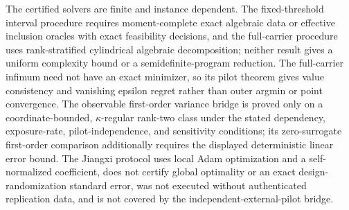 The certified solvers are finite and instance dependent.  The fixed-threshold interval procedure requires moment-complete exact algebraic data or effective inclusion oracles with exact feasibility decisions, and the full-carrier procedure uses rank-stratified cylindrical algebraic decomposition; neither result gives a uniform complexity bound or a semidefinite-program reduction.  The full-carrier infimum need not have an exact minimizer, so its pilot theorem gives value consistency and vanishing epsilon regret rather than outer argmin or point convergence.  The observable first-order variance bridge is proved only on a coordinate-bounded, \(\kappa\)-regular rank-two class under the stated dependency, exposure-rate, pilot-independence, and sensitivity conditions; its zero-surrogate first-order comparison additionally requires the displayed deterministic linear error bound.  The Jiangxi protocol uses local Adam optimization and a self-normalized coefficient, does not certify global optimality or an exact design-randomization standard error, was not executed without authenticated replication data, and is not covered by the independent-external-pilot bridge.